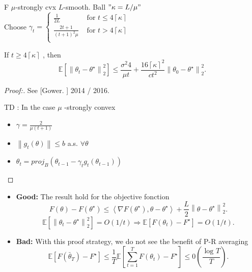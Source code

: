 \begin{thm}[]
    F $\mu$-strongly cvx $L$-smooth. Ball $"\kappa = L/ \mu "$ \\
    Choose $\gamma _t = \begin{cases}
        \frac{1}{2L} &\text{ for } t \leq 4 \left\lceil \kappa  \right\rceil \\
        \frac{2t+1}{(t+1)^2 \mu} &\text{ for } t > 4 \left\lceil \kappa  \right\rceil \\
    \end{cases} $

    If $ t \geq 4 \left\lceil \kappa \right\rceil  $ , then 
    \[
        \mathbb{E}[\left\| \theta _t - \theta ^\star  \right\| _2 ^2 ] \leq \frac{\sigma ^2 4}{\mu t} + \frac{16 \left\lceil \kappa  \right\rceil ^2 }{c t^2} \left\| \theta _0 - \theta ^\star  \right\| _2 ^2
    .\]
    
\end{thm}

\begin{proof}[Proof:]
    See [Gower. ] 2014 / 2016. 
    
    TD : In the case $ \mu  $ -strongly convex \begin{itemize}
        \item $ \gamma = \frac{2}{\mu (t+1)} $
        \item $ \left\| g_t (\theta ) \right\| \leq b $  a.s. $ \forall \theta  $ 
        \item $ \theta _t = proj_B (\theta _{t-1} - \gamma _t g_t (\theta _{t-1})) $ 
    \end{itemize}
\end{proof}

\begin{note}[]
    \begin{itemize}
        \item \textbf{Good: } The result hold for the objective fonction 
        \[
            F(\theta ) - F(\theta ^\star ) \leq \left\langle \nabla F(\theta ^\star ), \theta - \theta ^\star  \right\rangle  + \frac{L}{2} \left\| \theta - \theta ^\star  \right\| _2 ^2 
        .\]
        \[
            \mathbb{E}[\left\| \theta _t - \theta ^\star  \right\| _2 ^2] = O(1/t) \Rightarrow \mathbb{E}[F(\theta _t) - F^\star ] = O(1/t)
        .\]
        
        \item \textbf{Bad: } With this proof strategy, we do not see the benefit of P-R averaging
        \[
            \mathbb{E}[F ( \bar{\theta}_T ) - F^\star ] \leq \frac{1}{T} \mathbb{E}[ \sum_{t=1}^{T} F(\theta _t) - F^\star ] \leq 0(\frac{\log_{} T  }{T})
        .\]
    \end{itemize}
\end{note}

